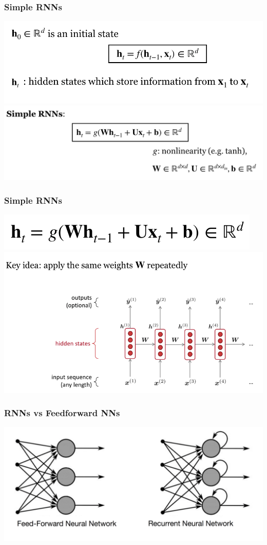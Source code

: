 \begin{frame}
\frametitle{Simple RNNs}
\centering
\includegraphics[scale=0.3]{figures/nlm/rnnsimple1.png}
\pause
\includegraphics[scale=0.25]{figures/nlm/rnnsimple2.png}
\end{frame}


\begin{frame}
\frametitle{Simple RNNs}
\centering
\includegraphics[scale=0.3]{figures/nlm/rnn-h.png}
\pause
\includegraphics[scale=0.4]{figures/nlm/rnnsameweights.png}
\end{frame}

\begin{frame}
\frametitle{RNNs vs Feedforward NNs}
\centering
\includegraphics[scale=0.3]{figures/nlm/rnnvsff.png}
\end{frame}

